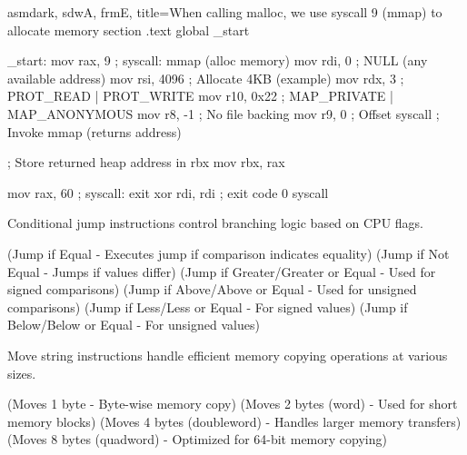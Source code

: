 \bigskip

\begin{NxCodeBox}{asm}{dark, sdwA, frmE, title={When calling malloc, we use syscall 9 (mmap) to allocate memory}}
	section .text
	global _start

	_start:
		mov rax, 9		 ; syscall: mmap (alloc memory)
		mov rdi, 0		 ; NULL (any available address)
		mov rsi, 4096	  ; Allocate 4KB (example)
		mov rdx, 3		 ; PROT_READ | PROT_WRITE
		mov r10, 0x22	  ; MAP_PRIVATE | MAP_ANONYMOUS
		mov r8, -1		 ; No file backing
		mov r9, 0		  ; Offset
		syscall			; Invoke mmap (returns address)

		; Store returned heap address in rbx
		mov rbx, rax	   

		mov rax, 60		; syscall: exit
		xor rdi, rdi	   ; exit code 0
		syscall
\end{NxCodeBox}

\bigskip

\begin{NxSSSSBox}
	\begin{NxIDBox}
		Conditional jump instructions control branching logic based on CPU flags.
		\begin{NxListDark}
			 (Jump if Equal - Executes jump if comparison indicates equality)
			 (Jump if Not Equal - Jumps if values differ)
			 (Jump if Greater/Greater or Equal - Used for signed comparisons)
			 (Jump if Above/Above or Equal - Used for unsigned comparisons)
			 (Jump if Less/Less or Equal - For signed values)
			 (Jump if Below/Below or Equal - For unsigned values)
		\end{NxListDark}
	\end{NxIDBox}
\end{NxSSSSBox}

\begin{NxSSSSBox}
	\begin{NxIDBox}
		Move string instructions handle efficient memory copying operations at various sizes.
		\begin{NxListDark}
			 (Moves 1 byte - Byte-wise memory copy)
			 (Moves 2 bytes (word) - Used for short memory blocks)
			 (Moves 4 bytes (doubleword) - Handles larger memory transfers)
			 (Moves 8 bytes (quadword) - Optimized for 64-bit memory copying)
		\end{NxListDark}
	\end{NxIDBox}
\end{NxSSSSBox}

